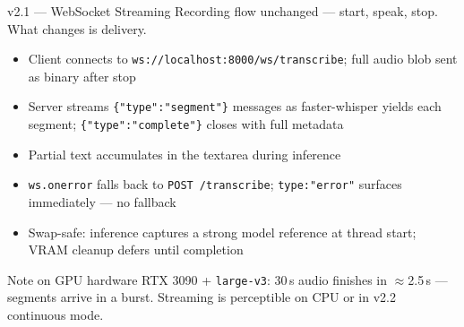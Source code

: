 \documentclass{beamer}
\begin{document}
\begin{frame}{v2.1 --- WebSocket Streaming}
    \small
    Recording flow unchanged --- start, speak, stop. What changes is delivery.

    \vspace{0.2em}
    \begin{itemize}\setlength{\itemsep}{0pt}\setlength{\parskip}{0pt}
        \item Client connects to \texttt{ws://localhost:8000/ws/transcribe};
              full audio blob sent as binary after stop
        \item Server streams \texttt{\{"type":"segment"\}} messages as
              faster-whisper yields each segment;
              \texttt{\{"type":"complete"\}} closes with full metadata
        \item Partial text accumulates in the textarea during inference
        \item \texttt{ws.onerror} falls back to \texttt{POST /transcribe};
              \texttt{type:"error"} surfaces immediately --- no fallback
        \item Swap-safe: inference captures a strong model reference at
              thread start; VRAM cleanup defers until completion
    \end{itemize}

    \vspace{0.1em}
    \begin{block}{Note on GPU hardware}
        \scriptsize
        RTX 3090 + \texttt{large-v3}: 30\,s audio finishes in $\approx$2.5\,s
        --- segments arrive in a burst. Streaming is perceptible on CPU or
        in v2.2 continuous mode.
    \end{block}
\end{frame}






\end{document}
